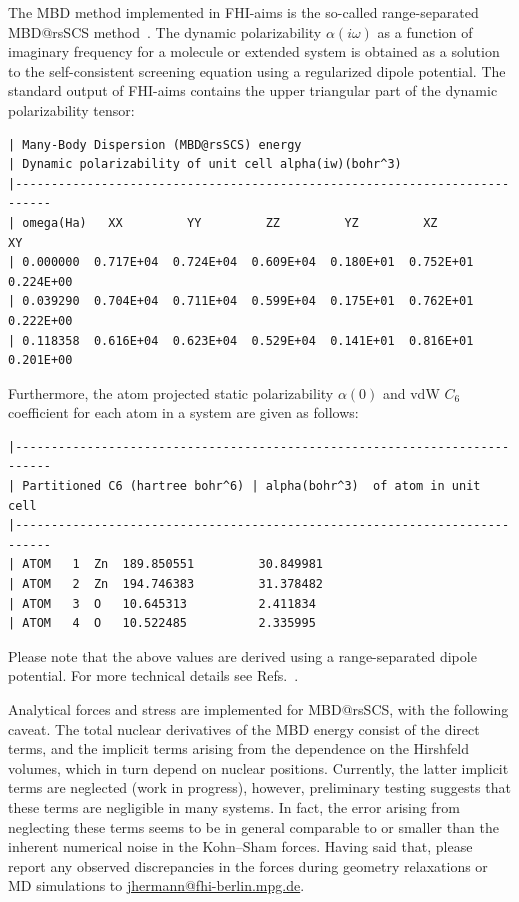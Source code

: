 The MBD method implemented in FHI-aims is the so-called range-separated
MBD@rsSCS method~\cite{MBD,QHORPA}. 
The dynamic polarizability $\alpha(i\omega)$ as a function of imaginary 
frequency for a molecule or extended system is obtained as a solution to the 
self-consistent screening equation using a regularized dipole potential. The 
standard output of FHI-aims contains the upper triangular part of the dynamic 
polarizability tensor: 
\begin{verbatim}
| Many-Body Dispersion (MBD@rsSCS) energy
| Dynamic polarizability of unit cell alpha(iw)(bohr^3)
|---------------------------------------------------------------------------
| omega(Ha)   XX         YY         ZZ         YZ         XZ         XY
| 0.000000  0.717E+04  0.724E+04  0.609E+04  0.180E+01  0.752E+01  0.224E+00
| 0.039290  0.704E+04  0.711E+04  0.599E+04  0.175E+01  0.762E+01  0.222E+00
| 0.118358  0.616E+04  0.623E+04  0.529E+04  0.141E+01  0.816E+01  0.201E+00
\end{verbatim}
Furthermore, the atom projected static polarizability $\alpha(0)$ and vdW 
$C_{6}$ coefficient for each atom in a system are given as follows:
\begin{verbatim}
|---------------------------------------------------------------------------
| Partitioned C6 (hartree bohr^6) | alpha(bohr^3)  of atom in unit cell
|---------------------------------------------------------------------------
| ATOM   1  Zn  189.850551         30.849981
| ATOM   2  Zn  194.746383         31.378482
| ATOM   3  O   10.645313          2.411834
| ATOM   4  O   10.522485          2.335995
\end{verbatim}
Please note that the above values are derived using a range-separated dipole 
potential. For more technical details see Refs.~\cite{MBD,QHORPA}.

Analytical forces and stress are implemented for MBD@rsSCS, with the 
following caveat.
The total nuclear derivatives of the MBD energy consist of the direct terms,
and the implicit terms arising from the dependence on the Hirshfeld volumes,
which in turn depend on nuclear positions.
Currently, the latter implicit terms are neglected (work in progress),
however, preliminary testing suggests that these terms are negligible
in many systems.
In fact, the error arising from neglecting these terms seems to be in 
general comparable to or smaller than the inherent numerical noise in 
the Kohn--Sham forces.
Having said that, please report any observed discrepancies in the forces 
during geometry relaxations or MD simulations to 
\href{mailto:jhermann@fhi-berlin.mpg.de?subject=\%5Baims\%20mbd-std\%5D}{jhermann@fhi-berlin.mpg.de}.

